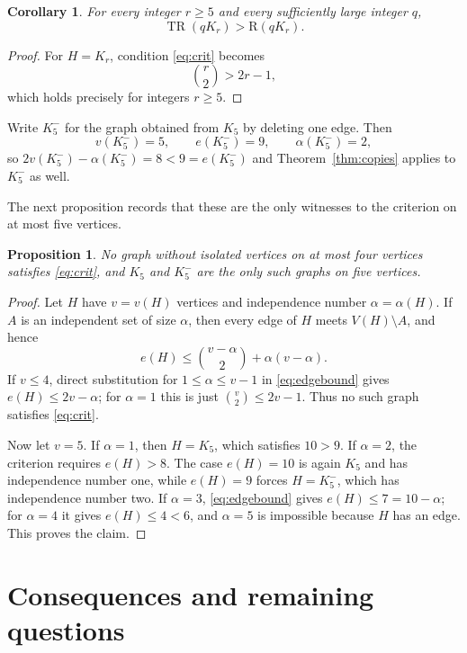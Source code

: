 \documentclass[11pt,reqno]{amsart}
\theoremstyle{plain}
\newtheorem{proposition}[theorem]{Proposition}
\newtheorem{corollary}[theorem]{Corollary}
\theoremstyle{definition}
\theoremstyle{remark}
\DeclareMathOperator{\TR}{TR}
\newcommand{\R}{\mathrm{R}}
\begin{document}
\begin{corollary}
For every integer $r \geq 5$ and every sufficiently large integer $q$,
\[
\TR(qK_r) > \R(qK_r).
\]
\end{corollary}

\begin{proof}
For $H = K_r$, condition \eqref{eq:crit} becomes
\[
\binom{r}{2} > 2r - 1,
\]
which holds precisely for integers $r \geq 5$.
\end{proof}

Write $K_5^-$ for the graph obtained from $K_5$ by deleting one edge. Then
\[
v(K_5^-) = 5, \qquad e(K_5^-) = 9, \qquad \alpha(K_5^-) = 2,
\]
so $2v(K_5^-) - \alpha(K_5^-) = 8 < 9 = e(K_5^-)$ and Theorem~\ref{thm:copies} applies to $K_5^-$ as well.

The next proposition records that these are the only witnesses to the criterion on at most five vertices.

\begin{proposition}
No graph without isolated vertices on at most four vertices satisfies \eqref{eq:crit}, and $K_5$ and $K_5^-$ are the only such graphs on five vertices.
\end{proposition}

\begin{proof}
Let $H$ have $v = v(H)$ vertices and independence number $\alpha = \alpha(H)$. If $A$ is an independent set of size $\alpha$, then every edge of $H$ meets $V(H) \setminus A$, and hence
\begin{equation}\label{eq:edgebound}
e(H) \leq \binom{v - \alpha}{2} + \alpha(v - \alpha).
\end{equation}
If $v \leq 4$, direct substitution for $1 \leq \alpha \leq v-1$ in \eqref{eq:edgebound} gives $e(H) \leq 2v - \alpha$; for $\alpha = 1$ this is just $\binom{v}{2} \leq 2v - 1$. Thus no such graph satisfies \eqref{eq:crit}.

Now let $v = 5$. If $\alpha = 1$, then $H = K_5$, which satisfies $10 > 9$. If $\alpha = 2$, the criterion requires $e(H) > 8$. The case $e(H) = 10$ is again $K_5$ and has independence number one, while $e(H) = 9$ forces $H = K_5^-$, which has independence number two. If $\alpha = 3$, \eqref{eq:edgebound} gives $e(H) \leq 7 = 10 - \alpha$; for $\alpha = 4$ it gives $e(H) \leq 4 < 6$, and $\alpha = 5$ is impossible because $H$ has an edge. This proves the claim.
\end{proof}

\section{Consequences and remaining questions}
\end{document}
